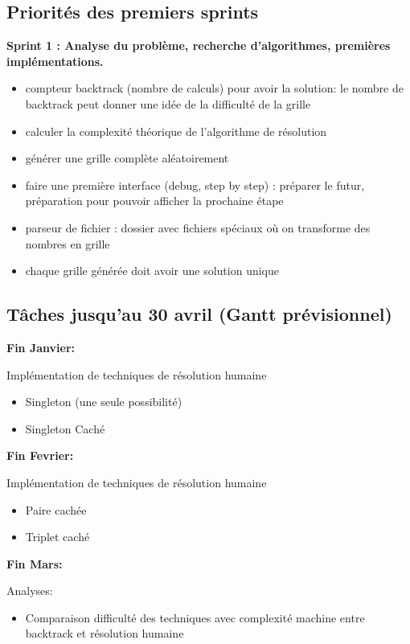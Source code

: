 \documentclass[a4paper]{article}
\begin{document}
\subsection*{Priorités des premiers sprints}
\textbf{Sprint 1 : Analyse du problème, recherche d’algorithmes, premières implémentations.}
\begin{itemize}
  \item compteur backtrack (nombre de calculs) pour avoir la solution: le nombre de backtrack peut donner une idée de la difficulté de la grille
  \item calculer la complexité théorique de l’algorithme de résolution
  \item générer une grille complète aléatoirement
  \item faire une première interface (debug, step by step) : préparer le futur, préparation pour pouvoir afficher la prochaine étape
  \item parseur de fichier : dossier avec fichiers spéciaux où on transforme des nombres en grille
  \item chaque grille générée doit avoir une solution unique
\end{itemize}

\subsection*{Tâches jusqu’au 30 avril (Gantt prévisionnel)}
\textbf{Fin Janvier:}

Implémentation de techniques de résolution humaine
\begin{itemize}
  \item Singleton (une seule possibilité)
  \item Singleton Caché\\
\end{itemize}

\textbf{Fin Fevrier:}

Implémentation de techniques de résolution humaine
\begin{itemize}
  \item Paire cachée
  \item Triplet caché\\
\end{itemize}

\textbf{Fin Mars:}

Analyses:
\begin{itemize}
  \item Comparaison difficulté des techniques avec complexité machine entre backtrack et résolution humaine\\
\end{itemize}
\end{document}
